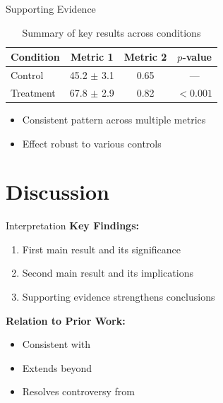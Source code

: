\documentclass[aspectratio=169,11pt]{beamer}
\begin{document}
\begin{frame}{Supporting Evidence}
  \begin{table}
    \centering
    \caption{Summary of key results across conditions}
    \begin{tabular}{lccc}
      \toprule
      \textbf{Condition} & \textbf{Metric 1} & \textbf{Metric 2} & \textbf{$p$-value} \\
      \midrule
      Control    & 45.2 $\pm$ 3.1 & 0.65 & --- \\
      Treatment  & 67.8 $\pm$ 2.9 & 0.82 & $< 0.001$ \\
      \bottomrule
    \end{tabular}
  \end{table}
  
  \vspace{0.5cm}
  
  \begin{itemize}
    \item Consistent pattern across multiple metrics
    \item Effect robust to various controls
  \end{itemize}
\end{frame}


\section{Discussion}

\begin{frame}{Interpretation}
  \textbf{Key Findings:}
  \begin{enumerate}
    \item First main result and its significance
    \item Second main result and its implications
    \item Supporting evidence strengthens conclusions
  \end{enumerate}
  
  \vspace{0.5cm}
  
  \textbf{Relation to Prior Work:}
  \begin{itemize}
    \item Consistent with \cite{reference1}
    \item Extends beyond \cite{reference2}
    \item Resolves controversy from \cite{reference3}
  \end{itemize}
\end{frame}
\end{document}
